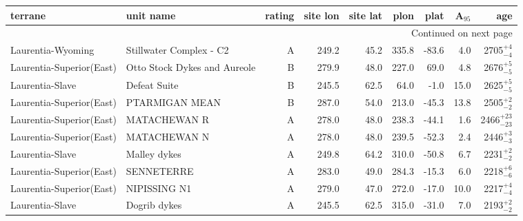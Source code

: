 \begin{longtable}{p{1 in}p{1 in}rrrrrrr}
\toprule
                       terrane &                                          unit name & rating &  site lon &  site lat &  plon &  plat &  A$_{95}$ &                    age \\ \hline
\midrule
\endhead
\midrule
\multicolumn{9}{r}{{Continued on next page}} \\ \hline
\midrule
\endfoot

\bottomrule
\endlastfoot
             Laurentia-Wyoming &                            Stillwater Complex - C2 &      A &     249.2 &      45.2 & 335.8 & -83.6 &       4.0 &     2705$^{+4}_{-4}$ \\ \hline
      Laurentia-Superior(East) &                       Otto Stock Dykes and Aureole &      B &     279.9 &      48.0 & 227.0 &  69.0 &       4.8 &     2676$^{+5}_{-5}$ \\ \hline
               Laurentia-Slave &                                       Defeat Suite &      B &     245.5 &      62.5 &  64.0 &  -1.0 &      15.0 &     2625$^{+5}_{-5}$ \\ \hline
      Laurentia-Superior(East) &                                     PTARMIGAN MEAN &      B &     287.0 &      54.0 & 213.0 & -45.3 &      13.8 &     2505$^{+2}_{-2}$ \\ \hline
      Laurentia-Superior(East) &                                       MATACHEWAN R &      A &     278.0 &      48.0 & 238.3 & -44.1 &       1.6 &   2466$^{+23}_{-23}$ \\ \hline
      Laurentia-Superior(East) &                                       MATACHEWAN N &      A &     278.0 &      48.0 & 239.5 & -52.3 &       2.4 &     2446$^{+3}_{-3}$ \\ \hline
               Laurentia-Slave &                                       Malley dykes &      A &     249.8 &      64.2 & 310.0 & -50.8 &       6.7 &     2231$^{+2}_{-2}$ \\ \hline
      Laurentia-Superior(East) &                                         SENNETERRE &      A &     283.0 &      49.0 & 284.3 & -15.3 &       6.0 &     2218$^{+6}_{-6}$ \\ \hline
      Laurentia-Superior(East) &                                       NIPISSING N1 &      A &     279.0 &      47.0 & 272.0 & -17.0 &      10.0 &     2217$^{+4}_{-4}$ \\ \hline
               Laurentia-Slave &                                       Dogrib dykes &      A &     245.5 &      62.5 & 315.0 & -31.0 &       7.0 &     2193$^{+2}_{-2}$ \\ \hline

\end{longtable}
